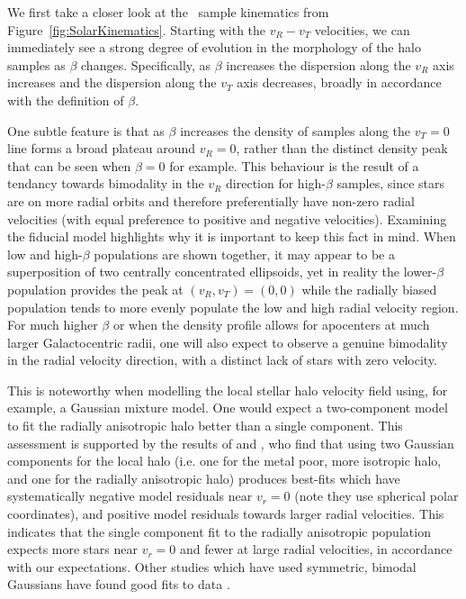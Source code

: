 We first take a closer look at the \solar\ sample kinematics from Figure~\ref{fig:SolarKinematics}. Starting with the $v_{R}-v_{T}$ velocities, we can immediately see a strong degree of evolution in the morphology of the halo samples as $\beta$ changes. Specifically, as $\beta$ increases the dispersion along the $v_{R}$ axis increases and the dispersion along the $v_{T}$ axis decreases, broadly in accordance with the definition of $\beta$. 

One subtle feature is that as $\beta$ increases the density of samples along the $v_{T}=0$ line forms a broad plateau around $v_{R}=0$, rather than the distinct density peak that can be seen when $\beta=0$ for example. This behaviour is the result of a tendancy towards bimodality in the $v_{R}$ direction for high-$\beta$ samples, since stars are on more radial orbits and therefore preferentially have non-zero radial velocities (with equal preference to positive and negative velocities). Examining the fiducial model highlights why it is important to keep this fact in mind. When low and high-$\beta$ populations are shown together, it may appear to be a superposition of two centrally concentrated ellipsoids, yet in reality the lower-$\beta$ population provides the peak at $(v_{R},v_{T}) = (0,0)$ while the radially biased population tends to more evenly populate the low and high radial velocity region. For much higher $\beta$ or when the density profile allows for apocenters at much larger Galactocentric radii, one will also expect to observe a genuine bimodality in the radial velocity direction, with a distinct lack of stars with zero velocity. 

This is noteworthy when modelling the local stellar halo velocity field using, for example, a Gaussian mixture model. One would expect a two-component model to fit the radially anisotropic halo better than a single component. This assessment is supported by the results of \textcite{belokurov18} and \textcite{fattahi19}, who find that using two Gaussian components for the local halo (i.e. one for the metal poor, more isotropic halo, and one for the radially anisotropic halo) produces best-fits which have systematically negative model residuals near $v_{r}=0$ (note they use spherical polar coordinates), and positive model residuals towards larger radial velocities. This indicates that the single component fit to the radially anisotropic population expects more stars near $v_{r}=0$ and fewer at large radial velocities, in accordance with our expectations. Other studies which have used symmetric, bimodal Gaussians have found good fits to data \parencite{lancaster19,necib19}.


